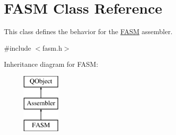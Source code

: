 \hypertarget{class_f_a_s_m}{}\section{F\+A\+S\+M Class Reference}
\label{class_f_a_s_m}


This class defines the behavior for the \hyperlink{class_f_a_s_m}{F\+A\+S\+M} assembler.  




{\ttfamily \#include $<$fasm.\+h$>$}

Inheritance diagram for F\+A\+S\+M\+:\begin{figure}[H]
\begin{center}
\leavevmode
\includegraphics[height=3.000000cm]{class_f_a_s_m}
\end{center}
\end{figure}
